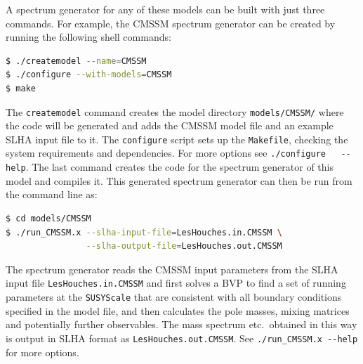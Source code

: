 \documentclass[final,3p,11pt,pdflatex]{elsarticle}
\newcommand{\code}[1]{\lstinline|#1|}  %
\begin{document}
A spectrum generator for any of these models can be built with just
three commands.  For example, the CMSSM spectrum generator can be
created by running the following shell commands:
%
\begin{lstlisting}[language=bash]
$ ./createmodel --name=CMSSM
$ ./configure --with-models=CMSSM
$ make
\end{lstlisting}%
%
The \code{createmodel} command creates the model directory
\code{models/CMSSM/} where the code will be generated and adds the
CMSSM model file and an example SLHA input file to it.  The \code{configure}
script sets up the \code{Makefile}, checking the system requirements
and dependencies.  For more options see \code{./configure
  --help}.  The last command creates the code for the spectrum
generator of this model and compiles it.
%
This generated spectrum generator can then be run from the command
line as:
%
\begin{lstlisting}[language=bash]
$ cd models/CMSSM
$ ./run_CMSSM.x --slha-input-file=LesHouches.in.CMSSM \
                --slha-output-file=LesHouches.out.CMSSM
\end{lstlisting}
%
The spectrum generator reads the CMSSM input parameters from the SLHA input file
\code{LesHouches.in.CMSSM} and first solves a BVP to find a
set of running parameters at the \code{SUSYScale} that are consistent with all
boundary conditions specified in the model file, and then calculates the pole
masses, mixing matrices and potentially further observables.
The mass spectrum etc.\ obtained in this way is output
in SLHA format \cite{Skands:2003cj,Allanach:2008qq} as
\code{LesHouches.out.CMSSM}.  See \code{./run_CMSSM.x --help} for more
options.
\end{document}
